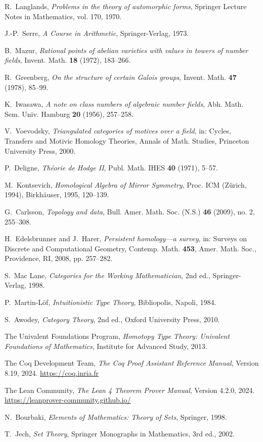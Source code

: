 \documentclass[11pt]{article}
\begin{document}
\begin{thebibliography}{99}

R.~Langlands, \emph{Problems in the theory of automorphic forms}, Springer Lecture Notes in Mathematics, vol. 170, 1970.

J.-P.~Serre, \emph{A Course in Arithmetic}, Springer-Verlag, 1973.

B.~Mazur, \emph{Rational points of abelian varieties with values in towers of number fields}, Invent. Math. \textbf{18} (1972), 183–266.

R.~Greenberg, \emph{On the structure of certain Galois groups}, Invent. Math. \textbf{47} (1978), 85–99.

K.~Iwasawa, \emph{A note on class numbers of algebraic number fields}, Abh. Math. Sem. Univ. Hamburg \textbf{20} (1956), 257–258.

V.~Voevodsky, \emph{Triangulated categories of motives over a field}, in: Cycles, Transfers and Motivic Homology Theories, Annals of Math. Studies, Princeton University Press, 2000.

P.~Deligne, \emph{Théorie de Hodge II}, Publ. Math. IHES \textbf{40} (1971), 5–57.

M.~Kontsevich, \emph{Homological Algebra of Mirror Symmetry}, Proc. ICM (Zürich, 1994), Birkhäuser, 1995, 120–139.

G.~Carlsson, \emph{Topology and data}, Bull. Amer. Math. Soc. (N.S.) \textbf{46} (2009), no. 2, 255–308.

H.~Edelsbrunner and J.~Harer, \emph{Persistent homology—a survey}, in: Surveys on Discrete and Computational Geometry, Contemp. Math. \textbf{453}, Amer. Math. Soc., Providence, RI, 2008, pp. 257–282.

S.~Mac Lane, \emph{Categories for the Working Mathematician}, 2nd ed., Springer-Verlag, 1998.

P.~Martin-Löf, \emph{Intuitionistic Type Theory}, Bibliopolis, Napoli, 1984.

S.~Awodey, \emph{Category Theory}, 2nd ed., Oxford University Press, 2010.

The Univalent Foundations Program, \emph{Homotopy Type Theory: Univalent Foundations of Mathematics}, Institute for Advanced Study, 2013.

The Coq Development Team, \emph{The Coq Proof Assistant Reference Manual}, Version 8.19, 2024. \url{https://coq.inria.fr}

The Lean Community, \emph{The Lean 4 Theorem Prover Manual}, Version 4.2.0, 2024. \url{https://leanprover-community.github.io/}

N.~Bourbaki, \emph{Elements of Mathematics: Theory of Sets}, Springer, 1998.

T.~Jech, \emph{Set Theory}, Springer Monographs in Mathematics, 3rd ed., 2002.

\end{thebibliography}
\end{document}
